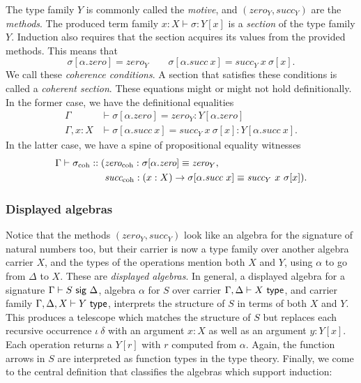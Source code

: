 The type family $Y$ is commonly called the \emph{motive}, and $(\textit{zero}_Y,
\textit{succ}_Y)$ are the \emph{methods}.
The produced term family $x : X \vdash \sigma : Y[x]$ is a \emph{section} of the type family $Y$.
Induction also requires that the section acquires its values from the provided methods.
This means that
\[\sigma[\alpha.\textit{zero}] = \textit{zero}_Y \qquad \sigma [\alpha.\textit{succ}\ x] = \textit{succ}_Y\ x\ \sigma[x].\]
We call these \emph{coherence conditions}.
A section that satisfies these conditions is called a \emph{coherent section}.
These equations might or might not hold definitionally. In the former case, we have the
definitional equalities
\begin{align*}
\Gamma &\vdash \sigma[\alpha.\textit{zero}] = \textit{zero}_Y : Y[\alpha.\textit{zero}] \\
\Gamma, x : X &\vdash \sigma[\alpha.\textit{succ}\ x] = \textit{succ}_Y\ x\ \sigma[x] : Y[\alpha.\textit{succ}\ x].
\end{align*}
In the latter case, we have a spine of propositional equality witnesses
\begin{align*}
\Gamma \vdash \sigma_{\text{coh}} :: (&\textit{zero}_{\text{coh}} :  \sigma[\alpha.\textit{zero}] \equiv \textit{zero}_Y, \\
&\textit{succ}_{\text{coh}} : (x : X) \to \sigma[\alpha.\textit{succ}\ x] \equiv \textit{succ}_Y\ x\ \sigma[x]).
\end{align*}

\subsubsection{Displayed algebras}
Notice that the methods $(\textit{zero}_Y, \textit{succ}_Y)$ look like an
algebra for the signature of natural numbers too, but their carrier is now a
type family over another algebra carrier $X$, and the types of the operations mention both
$X$ and $Y$, using $\alpha$ to go from $\Delta$ to $X$. These are \emph{displayed algebras}. In
general, a displayed algebra for a signature $\Gamma \vdash S \ \textsf{sig}\  \Delta$,
algebra $\alpha$ for $S$ over carrier $\Gamma, \Delta \vdash X \ \textsf{type}$, and
carrier family $\Gamma, \Delta, X \vdash Y \ \textsf{type}$, interprets the structure of
$S$ in terms of both $X$ and $Y$. This produces a telescope which matches the
structure of $S$ but replaces each recursive occurrence $\iota\ \delta$ with an
argument $x : X$ as well as an argument $y : Y[x]$. Each operation returns a $Y[r]$ with $r$
computed from $\alpha$. Again, the function arrows in $S$ are interpreted as
function types in the type theory. Finally, we come to the central definition
that classifies the algebras which
support induction:


